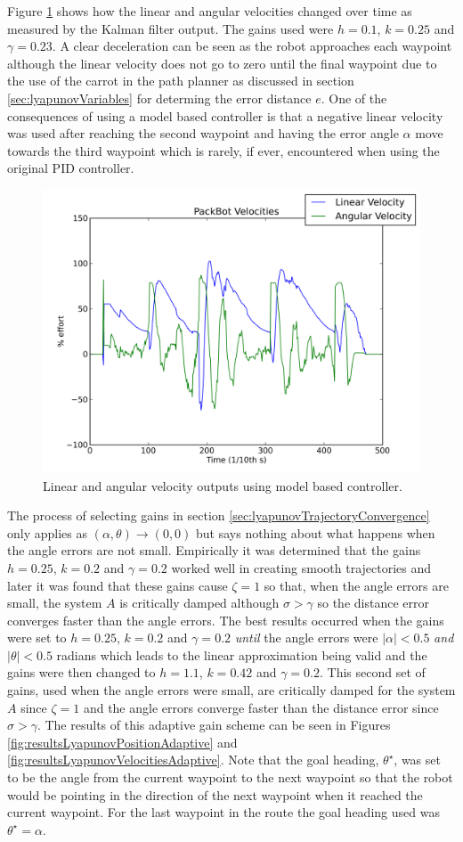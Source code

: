 Figure \ref{fig:resultsLyapunovVelocities} shows how the linear and angular velocities changed over time as measured by the Kalman filter output. The gains used were $h=0.1$, $k=0.25$ and $\gamma=0.23$. A clear deceleration can be seen as the robot approaches each waypoint although the linear velocity does not go to zero until the final waypoint due to the use of the carrot in the path planner as discussed in section \ref{sec:lyapunovVariables} for determing the error distance $e$. One of the consequences of using a model based controller is that a negative linear velocity was used after reaching the second waypoint and having the error angle $\alpha$ move towards the third waypoint which is rarely, if ever, encountered when using the original PID controller.

\begin{figure}[ht!]
	\centering
	\includegraphics[width=.5\textwidth]{images/20100918_1717_velocities}
	\caption{Linear and angular velocity outputs using model based controller.}
	\label{fig:resultsLyapunovVelocities}
\end{figure}

The process of selecting gains in section \ref{sec:lyapunovTrajectoryConvergence} only applies as $(\alpha, \theta)\to(0,0)$ but says nothing about what happens when the angle errors are not small. Empirically it was determined that the gains $h=0.25$, $k=0.2$ and $\gamma=0.2$ worked well in creating smooth trajectories and later it was found that these gains cause $\zeta=1$ so that, when the angle errors are small, the system $A$ is critically damped although $\sigma>\gamma$ so the distance error converges faster than the angle errors. The best results occurred when the gains were set to $h=0.25$, $k=0.2$ and $\gamma=0.2$ \textit{until} the angle errors were $|\alpha|<0.5$ \textit{and} $|\theta|<0.5$ radians which leads to the linear approximation being valid and the gains were then changed to $h=1.1$, $k=0.42$ and $\gamma=0.2$. This second set of gains, used when the angle errors were small, are critically damped for the system $A$ since $\zeta=1$ and the angle errors converge faster than the distance error since $\sigma>\gamma$. The results of this adaptive gain scheme can be seen in Figures \ref{fig:resultsLyapunovPositionAdaptive} and \ref{fig:resultsLyapunovVelocitiesAdaptive}. Note that the goal heading, $\theta^\star$, was set to be the angle from the current waypoint to the next waypoint so that the robot would be pointing in the direction of the next waypoint when it reached the current waypoint. For the last waypoint in the route the goal heading used was $\theta^\star=\alpha$.

